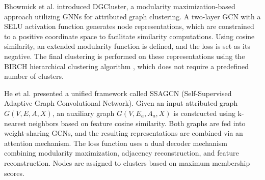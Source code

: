 Bhowmick et al. \cite{bhowmick2024dgcluster} introduced DGCluster, a modularity maximization-based approach utilizing GNNs for attributed graph clustering. A two-layer GCN with a SELU activation function generates node representations, which are constrained to a positive coordinate space to facilitate similarity computations. Using cosine similarity, an extended modularity function is defined, and the loss is set as its negative. The final clustering is performed on these representations using the BIRCH hierarchical clustering algorithm \cite{zhang1996birch}, which does not require a predefined number of clusters.

He et al. \cite{he2024detecting} presented a unified framework called SSAGCN (Self-Supervised Adaptive Graph Convolutional Network). Given an input attributed graph $G(V,E,A,X)$, an auxiliary graph $G(V,E_a,A_a,X)$ is constructed using k-nearest neighbors based on feature cosine similarity. Both graphs are fed into weight-sharing GCNs, and the resulting representations are combined via an attention mechanism. The loss function uses a dual decoder mechanism combining modularity maximization, adjacency reconstruction, and feature reconstruction. Nodes are assigned to clusters based on maximum membership scores.

